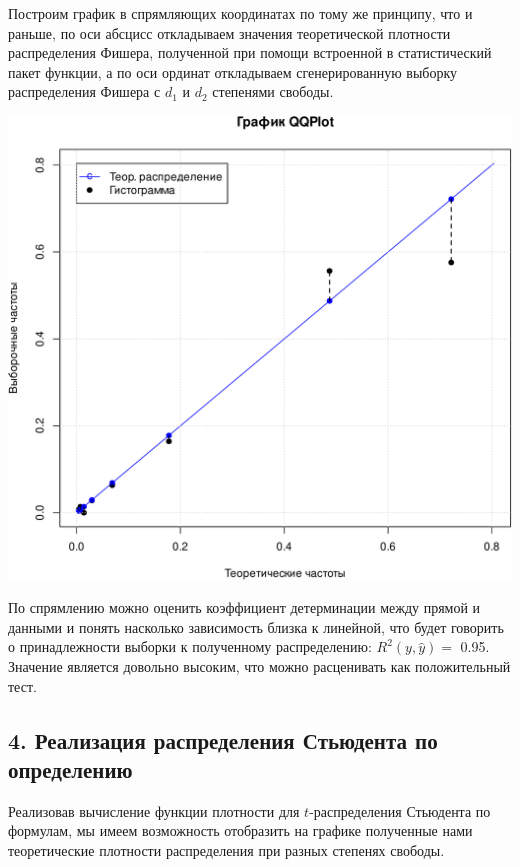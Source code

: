\documentclass[
]{article}
\begin{document}
Построим график в спрямляющих координатах по тому же принципу, что и
раньше, по оси абсцисс откладываем значения теоретической плотности
распределения Фишера, полученной при помощи встроенной в статистический
пакет функции, а по оси ординат откладываем сгенерированную выборку
распределения Фишера с \(d_1\) и \(d_2\) степенями свободы.

\begin{center}\includegraphics[width=0.6\linewidth]{Prac4_files/figure-latex/unnamed-chunk-8-1} \end{center}

По спрямлению можно оценить коэффициент детерминации между прямой и
данными и понять насколько зависимость близка к линейной, что будет
говорить о принадлежности выборки к полученному распределению:
\(R^2(y, \hat{y}) =\) 0.95. Значение является довольно высоким, что
можно расценивать как положительный тест.

\hypertarget{ux440ux435ux430ux43bux438ux437ux430ux446ux438ux44f-ux440ux430ux441ux43fux440ux435ux434ux435ux43bux435ux43dux438ux44f-ux441ux442ux44cux44eux434ux435ux43dux442ux430-ux43fux43e-ux43eux43fux440ux435ux434ux435ux43bux435ux43dux438ux44e}{%
\subsection{4. Реализация распределения Стьюдента по
определению}\label{ux440ux435ux430ux43bux438ux437ux430ux446ux438ux44f-ux440ux430ux441ux43fux440ux435ux434ux435ux43bux435ux43dux438ux44f-ux441ux442ux44cux44eux434ux435ux43dux442ux430-ux43fux43e-ux43eux43fux440ux435ux434ux435ux43bux435ux43dux438ux44e}}

Реализовав вычисление функции плотности для \(t\)-распределения
Стьюдента по формулам, мы имеем возможность отобразить на графике
полученные нами теоретические плотности распределения при разных
степенях свободы.
\end{document}
